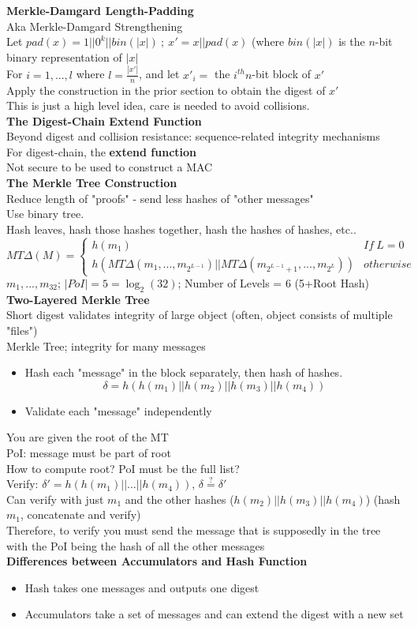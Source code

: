\documentclass{article}
\begin{document}
\textbf{Merkle-Damgard Length-Padding}\\
Aka Merkle-Damgard Strengthening\\
Let $pad(x)=1||0^k||bin(|x|)\ ;\ x'=x||pad(x)$ (where $bin(|x|)$ is the $n$-bit binary representation of $|x|$\\
For $i=1,...,l$ where $l=\frac{|x'|}{n}$, and let $x'_i=$ the $i^{th} n$-bit block of $x'$\\
Apply the construction in the prior section to obtain the digest of $x'$\\
This is just a high level idea, care is needed to avoid collisions.\\

\textbf{The Digest-Chain Extend Function}\\
Beyond digest and collision resistance: sequence-related integrity mechanisms\\
For digest-chain, the \textbf{extend function}\\
Not secure to be used to construct a MAC\\

\textbf{The Merkle Tree Construction}\\
Reduce length of "proofs" - send less hashes of "other messages"\\
Use binary tree.\\
Hash leaves, hash those hashes together, hash the hashes of hashes, etc..
\[MT\Delta(M)=\begin{cases}
	h(m_1) & If\ L=0\\
	h(MT\Delta(m_1,...,m_{2^{L-1}})||MT\Delta(m_{2^{L-1}+1},...,m_{2^L})) & otherwise
\end{cases}\]
$m_1, ..., m_{32}$; $|PoI| = 5 = \log_2(32)$; Number of Levels = 6 (5+Root Hash)\\

\textbf{Two-Layered Merkle Tree}\\
Short digest validates integrity of large object (often, object consists of multiple "files")\\
Merkle Tree; integrity for many messages\begin{itemize}
	\item Hash each "message" in the block separately, then hash of hashes.
		\[\delta=h(h(m_1)||h(m_2)||h(m_3)||h(m_4))\]
	\item Validate each "message" independently
\end{itemize}
You are given the root of the MT\\
PoI: message must be part of root\\
How to compute root? PoI must be the full list?\\
Verify: $\delta'=h(h(m_1)||...||h(m_4))$, $\delta\overset{?}{=}\delta'$\\
Can verify with just $m_1$ and the other hashes ($h(m_2)||h(m_3)||h(m_4)$) (hash $m_1$, concatenate and verify)\\
Therefore, to verify you must send the message that is supposedly in the tree with the PoI being the hash of all the other messages\\

\textbf{Differences between Accumulators and Hash Function}
\begin{itemize}
	\item Hash takes one messages and outputs one digest
	\item Accumulators take a set of messages and can extend the digest with a new set
\end{itemize}
\end{document}
